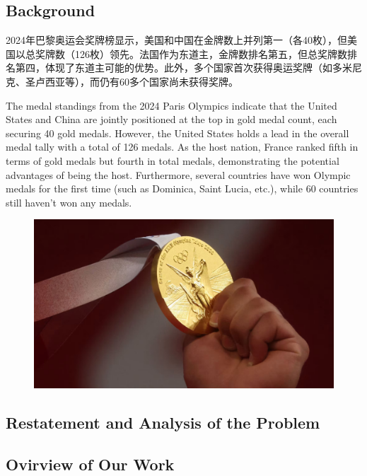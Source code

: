 \documentclass[13pt]{article}
\begin{document}
\subsection{Background}

2024年巴黎奥运会奖牌榜显示，美国和中国在金牌数上并列第一（各40枚），但美国以总奖牌数（126枚）领先。法国作为东道主，金牌数排名第五，但总奖牌数排名第四，体现了东道主可能的优势。此外，多个国家首次获得奥运奖牌（如多米尼克、圣卢西亚等），而仍有60多个国家尚未获得奖牌。


The medal standings from the 2024 Paris Olympics indicate that the United States and China are jointly positioned at the top in gold medal count, each securing 40 gold medals. However, the United States holds a lead in the overall medal tally with a total of 126 medals. As the host nation, France ranked fifth in terms of gold medals but fourth in total medals, demonstrating the potential advantages of being the host. Furthermore, several countries have won Olympic medals for the first time (such as Dominica, Saint Lucia, etc.), while 60 countries still haven't won any medals.

\begin{figure}
	\centering
	\includegraphics[width=0.7\linewidth]{fig/background}
	\caption{}
	\label{fig:background}
\end{figure}











\subsection{Restatement and Analysis of the Problem}










\subsection{Ovirview of Our Work}
\end{document}
